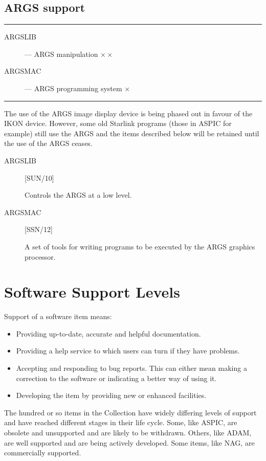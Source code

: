 \newpage

\subsection{ARGS support}

\rule{\textwidth}{0.5mm}
\begin{description}
\begin{description}
\item [ARGSLIB] --- ARGS manipulation \hfill $\times\times$
\item [ARGSMAC] --- ARGS programming system \hfill $\times$
\end{description}
\end{description}
\rule{\textwidth}{0.5mm}

The use of the ARGS image display device is being phased out in favour of the
IKON device.
However, some old Starlink programs (those in ASPIC for example) still use the
ARGS and the items described below will be retained until the use of the
ARGS ceases.

\begin{description}

\item [ARGSLIB] \hfill [SUN/10]

Controls the ARGS at a low level.

\item [ARGSMAC] \hfill [SSN/12]

A set of tools for writing programs to be executed by the ARGS graphics
processor.
\end{description}

\appendix
\newpage

\section{Software Support Levels}

Support of a software item means:
\begin{itemize}
\item Providing up-to-date, accurate and helpful documentation.
\item Providing a help service to which users can turn if they have problems.
\item Accepting and responding to bug reports.
This can either mean making a correction to the software or indicating a better
way of using it.
\item Developing the item by providing new or enhanced facilities.
\end{itemize}
The hundred or so items in the Collection have widely differing levels of
support and have reached different stages in their life cycle.
Some, like ASPIC, are obsolete and unsupported and are likely to be withdrawn.
Others, like ADAM, are well supported and are being actively developed.
Some items, like NAG, are commercially supported.

